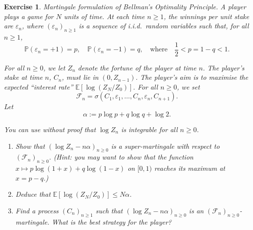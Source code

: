 \documentclass{article}
\newtheorem{exercise}[theorem]{Exercise}
\begin{document}
\begin{exercise}
\textit{Martingale formulation of Bellman's Optimality Principle.}
A player plays a game for $N$ units of time. At each time $n \geq 1$, the winnings per unit stake are $\varepsilon_n$, where $(\varepsilon_n)_{n \geq 1}$ is a sequence of i.i.d.\ random variables such that, for all $n \geq 1$,
\[
\mathbb{P}(\varepsilon_n = +1) = p, \quad \mathbb{P}(\varepsilon_n = -1) = q, \quad \text{where} \quad \frac{1}{2} < p = 1 - q < 1.
\]

For all $n \geq 0$, we let $Z_n$ denote the fortune of the player at time $n$. The player’s stake at time $n$, $C_n$, must lie in $(0, Z_{n-1})$. The player’s aim is to maximise the expected ``interest rate'' $\mathbb{E}[\log(Z_N / Z_0)]$. For all $n \geq 0$, we set 
\[
\mathcal{F}_n = \sigma(C_1, \varepsilon_1, \ldots, C_n, \varepsilon_n, C_{n+1}).
\]
Let
\[
\alpha := p \log p + q \log q + \log 2.
\]

You can use without proof that $\log Z_n$ is integrable for all $n \geq 0$.

\begin{enumerate}
    \item[(a)] Show that $(\log Z_n - n \alpha)_{n \geq 0}$ is a super-martingale with respect to $(\mathcal{F}_n)_{n \geq 0}$. \textit{(Hint: you may want to show that the function $x \mapsto p \log(1 + x) + q \log(1 - x)$ on $[0, 1)$ reaches its maximum at $x = p - q$.)}
    
    \item[(b)] Deduce that $\mathbb{E}[\log(Z_N / Z_0)] \leq N \alpha$.
    
    \item[(c)] Find a process $(C_n)_{n \geq 1}$ such that $(\log Z_n - n \alpha)_{n \geq 0}$ is an $(\mathcal{F}_n)_{n \geq 0}$-martingale. What is the best strategy for the player?
\end{enumerate}
\end{exercise}
\end{document}

